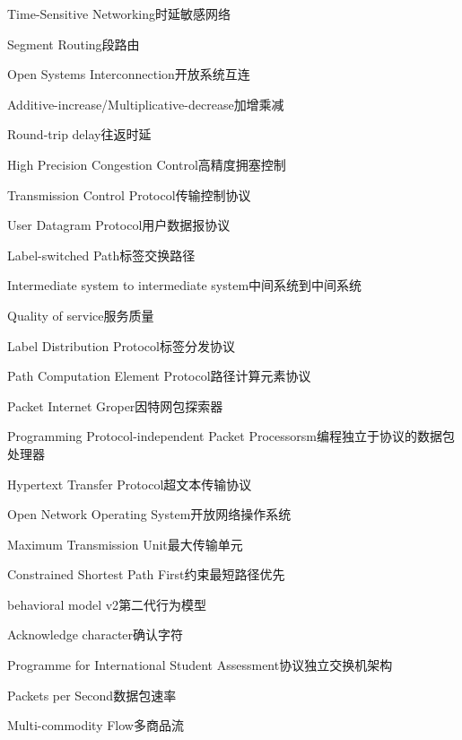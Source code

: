{Time-Sensitive Networking}{时延敏感网络}

{Segment Routing}{段路由}

{Open Systems Interconnection}{开放系统互连}

{Additive-increase/Multiplicative-decrease}{加增乘减}

{Round-trip delay}{往返时延}

{High Precision Congestion Control}{高精度拥塞控制}

{Transmission Control Protocol}{传输控制协议}

{User Datagram Protocol}{用户数据报协议}

{Label-switched Path}{标签交换路径}

{Intermediate system to intermediate system}{中间系统到中间系统}

{Quality of service}{服务质量}

{Label Distribution Protocol}{标签分发协议}

{Path Computation Element Protocol}{路径计算元素协议}

{Packet Internet Groper}{因特网包探索器}

{Programming Protocol-independent Packet Processorsm}{编程独立于协议的数据包处理器}

{Hypertext Transfer Protocol}{超文本传输协议}

{Open Network Operating System}{开放网络操作系统}

{Maximum Transmission Unit}{最大传输单元}

{Constrained Shortest Path First}{约束最短路径优先}

{behavioral model v2}{第二代行为模型}

{Acknowledge character}{确认字符}

{Programme for International Student Assessment}{协议独立交换机架构}

{Packets per Second}{数据包速率}

{Multi-commodity Flow}{多商品流}